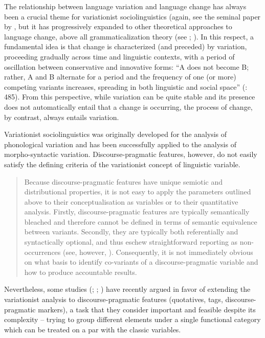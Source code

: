 The relationship between language variation and language change has always been a crucial theme for variationist sociolinguistics (again, see the seminal paper by \citet{WeinreichEtAl1968}, but it has progressively expanded to other theoretical approaches to language change, above all grammaticalization theory (see \citealt{NevalainenPalander-Collin2011}; \citealt{Poplack2011}). In this respect, a fundamental idea is that change is characterized (and preceded) by variation, proceeding gradually across time and linguistic contexts, with a period of oscillation between conservative and innovative forms: “A does not become B; rather, A and B alternate for a period and the frequency of one (or more) com\-peting variants increases, spreading in both linguistic and social space” (\citealt{Arcy2013}: 485). From this perspective, while variation can be quite stable and its presence does not automatically entail that a change is occurring, the process of change, by contrast, always entails variation.

\hspace*{-1.2pt}Variationist sociolinguistics was originally developed for the analysis of phonological variation and has been successfully applied to the analysis of morpho-syntactic variation. Discourse-pragmatic features, however, do not easily satisfy the defining criteria of the variationist concept of linguistic variable.

\begin{quote}
Because discourse-pragmatic features have unique semiotic and distributional properties, it is not easy to apply the parameters outlined above to their conceptualisation as variables or to their quantitative analysis. Firstly, discourse-pragmatic features are typically semantically bleached and therefore cannot be defined in terms of semantic equivalence between variants. Secondly, they are typically both referentially and syntactically optional, and thus eschew straightforward reporting as non-occurrences (see, however, \citealt{Arcy2005}). Consequently, it is not immediately obvious on what basis to identify co-variants of a discourse-pragmatic variable and how to produce accountable results. \citep[28]{Pichler2013}
\end{quote}

Nevertheless, some studies (\citealt{Terkourafi2011}; \citealt{Pichler2013,Pichler2016}; \citealt{Arcy2005,Arcy2017}) have recently argued in favor of extending the variationist analysis to discourse-pragmatic features (quotatives, tags, discourse-pragmatic markers), a task that they consider important and feasible despite its complexity – trying to group different elements under a single functional category which can be treated on a par with the classic variables.

